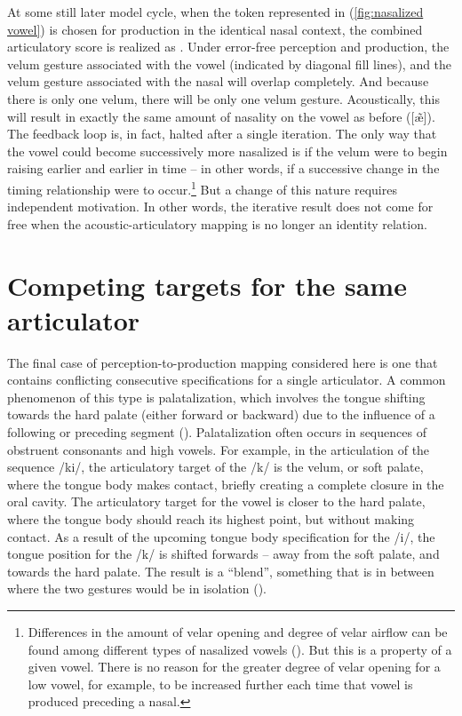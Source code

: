 At some still later model cycle, when the token represented in (\ref{fig:nasalized vowel})
is chosen for production in the identical nasal context, the combined
articulatory score is realized as .
Under error-free perception and production, the velum gesture associated
with the vowel (indicated by diagonal fill lines), and the velum gesture
associated with the nasal will overlap completely. And because there
is only one velum, there will be only one velum gesture. Acoustically,
this will result in exactly the same amount of nasality on the vowel
as before ({[æ̃]}). The feedback loop is, in fact, halted
after a single iteration. The only way that the vowel could become
successively more nasalized is if the velum were to begin raising
earlier and earlier in time – in other words, if a successive change
in the timing relationship were to occur.\footnote{Differences in the amount of velar opening and degree of velar airflow
can be found among different types of nasalized vowels (\citealt{bell1993understanding,hajek2000vowel}).
But this is a property of a given vowel. There is no reason for the
greater degree of velar opening for a low vowel, for example, to be
increased further each time that vowel is produced preceding a nasal.} But a change of this nature requires independent motivation. In
other words, the iterative result does not come for free when the
acoustic-articulatory mapping is no longer an identity relation. 

\section{\label{sec:Competing-targets}Competing targets for the same articulator}

The final case of perception-to-production mapping considered here
is one that contains conflicting consecutive specifications for a
single articulator. A common phenomenon of this type is palatalization,
which involves the tongue shifting towards the hard palate (either
forward or backward) due to the influence of a following or preceding
segment (\citealt{Guion1998,Keating1993}). Palatalization often occurs
in sequences of obstruent consonants and high vowels. For example,
in the articulation of the sequence {/ki/}, the articulatory
target of the {/k/} is the velum, or soft palate, where the
tongue body makes contact, briefly creating a complete closure in
the oral cavity. The articulatory target for the vowel is closer to
the hard palate, where the tongue body should reach its highest point,
but without making contact. As a result of the upcoming tongue body
specification for the {/i/}, the tongue position for the
{/k/} is shifted forwards – away from the soft palate, and
towards the hard palate. The result is a “blend”, something
that is in between where the two gestures would be in isolation (\citealt{Browman1986,Zsiga2000}). 

